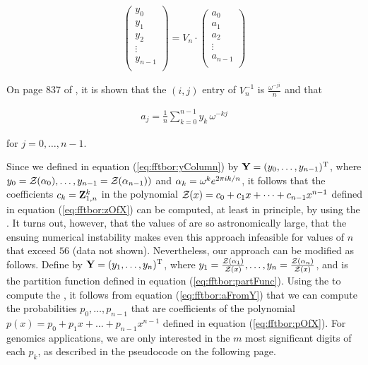 \begin{align}
\label{eq:fftbor:dftMatrix}
\left(
\begin{array}{l}
y_0 \\
y_1 \\
y_2 \\
\vdots \\
y_{n-1} \\
\end{array}
\right)
= V_n \cdot
\left(
\begin{array}{l}
a_0 \\
a_1 \\
a_2 \\
\vdots \\
a_{n-1} \\
\end{array}
\right)
\end{align}

On page 837 of \cite{cormen}, it is shown that the
$(i,j)$ entry of $V_n^{-1}$ is $\frac{\omega^{-j i}}{n}$
and that

\begin{align}
\label{eq:fftbor:aFromY}
a_j = \frac{1}{n} \sum_{k=0}^{n-1} y_k\,\omega^{-kj}
\end{align}

for $j=0,\dots,n-1$.

Since we defined \bfY in equation (\ref{eq:fftbor:yColumn}) by ${\bf Y} =
(y_0,\dots,y_{n-1})^{\text T}$, where
$y_0={\mathcal Z}_{}(\alpha_0),\dots,y_{n-1}={\mathcal Z}_{}(\alpha_{n-1}))$
and $\alpha_k = \omega^k e^{2 \pi i k/n}$, it follows that the coefficients
$c_k={\bf Z}^{k}_{1,n}$ in the polynomial
${\mathcal Z}_{}(x) = c_0 + c_1 x + \dots + c_{n-1} x^{n-1}$ defined in equation
(\ref{eq:fftbor:zOfX}) can be computed, at least in principle,
by using the \fft. It turns out, however, that the values of
 are so astronomically large, that the ensuing numerical
instability makes even this approach infeasible for values of $n$
that exceed $56$ (data not shown).
Nevertheless, our approach can be modified as follows.
Define \bfY by ${\bf Y} = (y_1,\dots,y_n)^{\text T}$, where
$y_1=\frac{{\mathcal Z}_{}(\alpha_1)}{{\mathcal Z}_{}(x)},\dots,
y_{n}=\frac{{\mathcal Z}_{}(\alpha_n)}{{\mathcal Z}_{}(x)}$, and
\bfZ{}{} is the partition function defined in equation (\ref{eq:fftbor:partFunc}).
Using the \fft to compute the \idft, it follows from equation
(\ref{eq:fftbor:aFromY}) that we can compute the probabilities $p_0,\dots,p_{n-1}$
that are coefficients of the polynomial
$p(x) = p_0 + p_1 x + \dots + p_{n-1}x^{n-1}$
defined in equation (\ref{eq:fftbor:pOfX}). For genomics applications, we are
only interested in the $m$ most significant digits of each $p_k$, as described
in the pseudocode on the following page.

